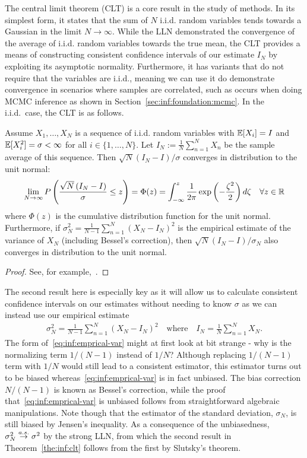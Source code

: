The central limit theorem (CLT) is a core result in the study of \mc methods.  In its simplest form,
it states that the sum of $N$ i.i.d. random variables tends towards a Gaussian in the limit $N\to\infty$.
While the LLN demonstrated the convergence of the average of i.i.d. random variables towards
the true mean, the CLT provides a means of constructing consistent confidence intervals of our estimate
$I_N$ by exploiting its asymptotic normality.  Furthermore, it has variants that do not
require that the variables are i.i.d., meaning we can use it do demonstrate convergence in scenarios
where samples are correlated, such as occurs when doing MCMC inference as shown in
Section~\ref{sec:inf:foundation:mcmc}.
In the i.i.d.~case, the CLT is as follows.
\begin{theorem}
	\label{the:inf:clt}
Assume $X_1,\dots,X_N$ is a sequence of i.i.d. random variables with 
$\mathbb{E} [X_i] = I$ and $\mathbb{E}[X_i^2]=\sigma<\infty$ for all  $i \in \{1,\dots,N\}$. Let 
$I_N := \frac{1}{N} \sum_{n=1}^{N} X_n$ be the
sample average of this sequence.  Then $\sqrt{N}\left(I_N-I\right)/\sigma$ converges
in distribution to the unit normal:
\begin{align}
\lim\limits_{N\rightarrow\infty} P\left(\frac{\sqrt{N}\left(I_N-I\right)}{\sigma} \le z\right)
=\Phi(z)= \int_{-\infty}^{z} \frac{1}{2\pi} \exp\left(-\frac{\zeta^2}{2}\right) d\zeta \quad \forall z\in\mathbb{R}
\end{align}
where $\Phi(z)$ is the cumulative distribution function for the unit normal.
Furthermore, if $\sigma_N^2 = \frac{1}{N-1} \sum_{n=1}^{N} \left(X_N-I_N\right)^2$ is
the empirical estimate of the variance of $X_N$ (including Bessel's correction), then
$\sqrt{N}\left(I_N-I\right)/\sigma_N$ also converges
in distribution to the unit normal.
\end{theorem}
\begin{proof}
	See, for example,~\cite[Chapter 3]{durrett2010probability}.
\end{proof}
\noindent The second result here is especially key as it will allow us to calculate consistent confidence intervals
on our estimates without needing to know $\sigma$ as we can instead use our empirical estimate
\begin{align}
	\label{eq:inf:emprical-var}
	\sigma_N^2 = \frac{1}{N-1} \sum_{n=1}^{N} \left(X_N-I_N\right)^2 \quad \mathrm{where} 
	\quad I_N = \frac{1}{N}\sum_{n=1}^{N}X_N.
\end{align}
The form of~\eqref{eq:inf:emprical-var} might at first look at bit strange - why is the normalizing
term $1/(N-1)$ instead of $1/N$?  Although replacing $1/(N-1)$ term with $1/N$ would still lead
to a consistent estimator, this estimator turns out to be biased whereas~\eqref{eq:inf:emprical-var}
is in fact unbiased.  The bias correction $N/(N-1)$ is known as Bessel's correction, while the proof
that~\eqref{eq:inf:emprical-var} is unbiased follows from straightforward algebraic manipulations.
Note though that the estimator of the standard deviation, $\sigma_N$, is still biased by Jensen's
inequality.
As a consequence of the unbiasedness, $\sigma_N^2 \overset{a.s.}{\to} \sigma^2$ by the strong LLN, 
from which the second result
in Theorem~\ref{the:inf:clt} follows from the first by Slutsky's theorem.


